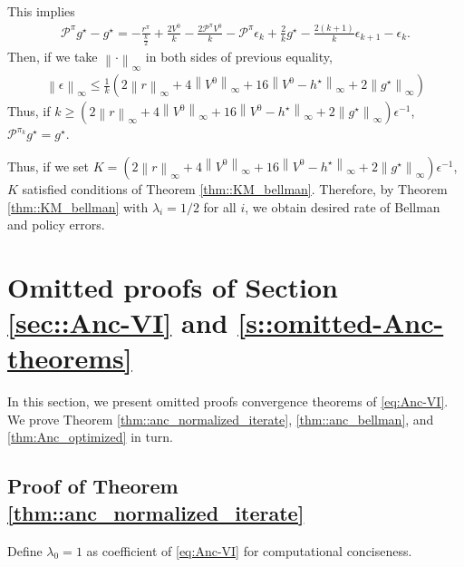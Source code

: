 \documentclass{article} %
\newcommand{\cP}{\mathcal{P}}
\newcommand*{\para}[1]{\left({#1}\right)}
\newcommand*{\infn}[1]{\left\|{#1}\right\|_{\infty}}
\begin{document}
    This implies
    \begin{align*}
        \cP^{\pi}g^{\star}-g^{\star} =  -\frac{r^{\pi}}{{\frac{k}{2}}}+\frac{2V^0}{k}-\frac{2\cP^{\pi}V^0}{k}-\cP^{\pi}\epsilon_k +\frac{2}{k}g^{\star}-\frac{2(k+1)}{k}\epsilon_{k+1}-\epsilon_k . 
    \end{align*}
 Then, if we take $\infn{\cdot}$ in both sides of previous equality,
        \begin{align*}
        \infn{\epsilon} \le  \frac{1}{k}\para{2\infn{r}+4\infn{V^0}+16\infn{V^0-h^{\star}} +2\infn{g^{\star}}}  
    \end{align*}
    Thus, if  $k \ge \para{2\infn{r}+4\infn{V^0}+16\infn{V^0-h^{\star}} +2\infn{g^{\star}}}\epsilon^{-1}$, $\cP^{\pi_k}g^{\star} =g^{\star}$.

Thus, if we set $K=\para{2\infn{r}+4\infn{V^0}+16\infn{V^0-h^{\star}} +2\infn{g^{\star}}}\epsilon^{-1}$, $K$ satisfied conditions of Theorem \ref{thm::KM_bellman}. Therefore, by  Theorem \ref{thm::KM_bellman} with $\lambda_i=1/2$ for all $i$, we obtain desired rate of Bellman and policy errors. 


\section{Omitted proofs of Section \ref{sec::Anc-VI} and \ref{s::omitted-Anc-theorems}}\label{s::omitted-Anc-VI-proofs}

In this section, we present omitted proofs convergence theorems of \ref{eq:Anc-VI}. We prove Theorem \ref{thm::anc_normalized_iterate}, \ref{thm::anc_bellman}, and \ref{thm:Anc_optimized} in turn.

\subsection{Proof of Theorem \ref{thm::anc_normalized_iterate}}
Define $\lambda_0 =1$ as coefficient of \ref{eq:Anc-VI} for computational conciseness.
\end{document}
